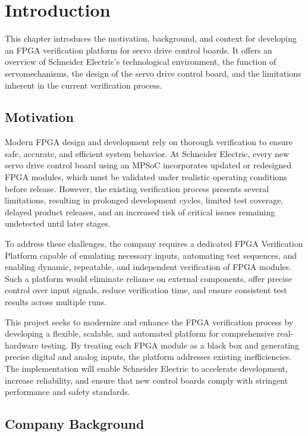 \chapter{Introduction}
\label{ch:intro}

This chapter introduces the motivation, background, and context for developing an \acs{FPGA} verification platform for servo drive control boards. It offers an overview of Schneider Electric’s technological environment, the function of servomechanisms, the design of the servo drive control board, and the limitations inherent in the current verification process.

\section{Motivation}
\label{sec:intro:motivation}

Modern \acs{FPGA} design and development rely on thorough verification to ensure safe, accurate, and efficient system behavior. At Schneider Electric, every new servo drive control board using an \acs{MPSoC} incorporates updated or redesigned \acs{FPGA} modules, which must be validated under realistic operating conditions before release. However, the existing verification process presents several limitations, resulting in prolonged development cycles, limited test coverage, delayed product releases, and an increased risk of critical issues remaining undetected until later stages.

To address these challenges, the company requires a dedicated \acs{FPGA} Verification Platform capable of emulating necessary inputs, automating test sequences, and enabling dynamic, repeatable, and independent verification of \acs{FPGA} modules. Such a platform would eliminate reliance on external components, offer precise control over input signals, reduce verification time, and ensure consistent test results across multiple runs.

This project seeks to modernize and enhance the \acs{FPGA} verification process by developing a flexible, scalable, and automated platform for comprehensive real-hardware testing. By treating each \acs{FPGA} module as a black box and generating precise digital and analog inputs, the platform addresses existing inefficiencies. The implementation will enable Schneider Electric to accelerate development, increase reliability, and ensure that new control boards comply with stringent performance and safety standards.

\section{Company Background}
\label{sec:intro:Company_Background}

